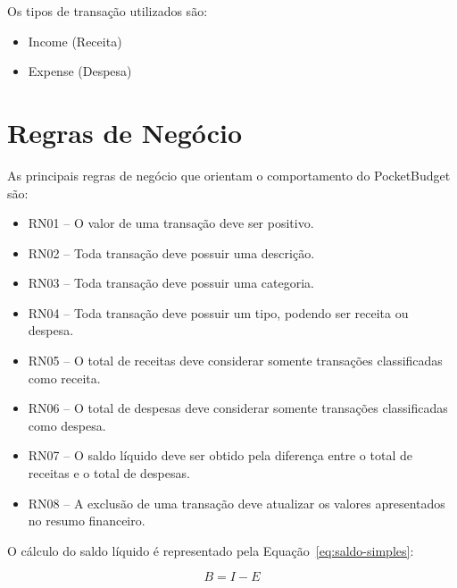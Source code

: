 \documentclass[12pt,a4paper]{article}
\begin{document}
Os tipos de transação utilizados são:

\begin{itemize}
    \item Income (Receita)
    \item Expense (Despesa)
\end{itemize}

\section{Regras de Negócio}

As principais regras de negócio que orientam o comportamento do PocketBudget são:

\begin{itemize}
    \item RN01 -- O valor de uma transação deve ser positivo.
    
    \item RN02 -- Toda transação deve possuir uma descrição.
    
    \item RN03 -- Toda transação deve possuir uma categoria.
    
    \item RN04 -- Toda transação deve possuir um tipo, podendo ser receita ou despesa.
    
    \item RN05 -- O total de receitas deve considerar somente transações classificadas como receita.
    
    \item RN06 -- O total de despesas deve considerar somente transações classificadas como despesa.
    
    \item RN07 -- O saldo líquido deve ser obtido pela diferença entre o total de receitas e o total de despesas.
    
    \item RN08 -- A exclusão de uma transação deve atualizar os valores apresentados no resumo financeiro.
\end{itemize}

O cálculo do saldo líquido é representado pela Equação~\eqref{eq:saldo-simples}:

\begin{equation}
    B = I - E
    \label{eq:saldo-simples}
\end{equation}
\end{document}
